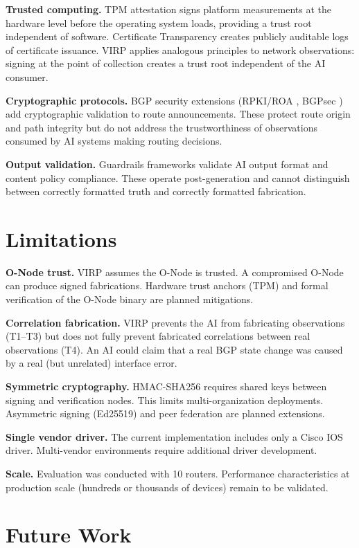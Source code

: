 \documentclass[11pt,twocolumn]{article}
\begin{document}
\textbf{Trusted computing.} TPM attestation \cite{tpm2} signs platform measurements at the hardware level before the operating system loads, providing a trust root independent of software. Certificate Transparency \cite{rfc6962} creates publicly auditable logs of certificate issuance. VIRP applies analogous principles to network observations: signing at the point of collection creates a trust root independent of the AI consumer.

\textbf{Cryptographic protocols.} BGP security extensions (RPKI/ROA \cite{rfc6480}, BGPsec \cite{rfc8205}) add cryptographic validation to route announcements. These protect route origin and path integrity but do not address the trustworthiness of observations consumed by AI systems making routing decisions.

\textbf{Output validation.} Guardrails frameworks \cite{guardrails} validate AI output format and content policy compliance. These operate post-generation and cannot distinguish between correctly formatted truth and correctly formatted fabrication.

\section{Limitations}

\textbf{O-Node trust.} VIRP assumes the O-Node is trusted. A compromised O-Node can produce signed fabrications. Hardware trust anchors (TPM) and formal verification of the O-Node binary are planned mitigations.

\textbf{Correlation fabrication.} VIRP prevents the AI from fabricating observations (T1--T3) but does not fully prevent fabricated correlations between real observations (T4). An AI could claim that a real BGP state change was caused by a real (but unrelated) interface error.

\textbf{Symmetric cryptography.} HMAC-SHA256 requires shared keys between signing and verification nodes. This limits multi-organization deployments. Asymmetric signing (Ed25519) and peer federation are planned extensions.

\textbf{Single vendor driver.} The current implementation includes only a Cisco IOS driver. Multi-vendor environments require additional driver development.

\textbf{Scale.} Evaluation was conducted with 10 routers. Performance characteristics at production scale (hundreds or thousands of devices) remain to be validated.

\section{Future Work}
\end{document}
